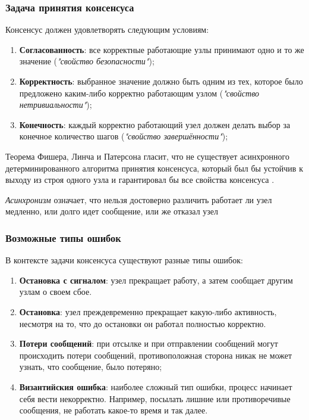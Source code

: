 \documentclass[pdf, 10pt, unicode,aspectratio=169]{beamer} %
\begin{document}
\begin{frame}
	\frametitle{Задача принятия консенсуса}

Консенсус должен удовлетворять следующим условиям:
\begin{enumerate}
\item \textbf{Согласованность}: все корректные работающие узлы принимают одно и то же значение (\textit{"свойство безопасности"});
\item \textbf{Корректность}: выбранное значение должно быть одним из тех, которое было предложено каким-либо корректно работающим узлом (\textit{"свойство нетривиальности"});
\item \textbf{Конечность}: каждый корректно работающий узел должен делать выбор за конечное количество шагов (\textit{"свойство завершённости"});
\end{enumerate}


Теорема Фишера, Линча и Патерсона гласит, что не существует асинхронного детерминированного алгоритма принятия консенсуса, который был бы устойчив к выходу из строя одного узла и гарантировал бы все свойства консенсуса \cite{Theorem_FLP}.

\emph{Асинхронизм} означает, что нельзя достоверно различить работает ли узел медленно, или долго идет сообщение, или же отказал узел

\end{frame}


\begin{frame}
	\frametitle{Возможные типы ошибок}

В контексте задачи консенсуса существуют разные типы ошибок:
\begin{enumerate}
\item \textbf{Остановка с сигналом}: узел прекращает работу, а затем сообщает другим узлам о своем сбое. 

\item \textbf{Остановка}: узел преждевременно прекращает какую-либо активность, несмотря на то, что до остановки он работал полностью корректно.

\item \textbf{Потери сообщений}: при отсылке и при отправлении сообщений могут происходить потери сообщений, противоположная сторона никак не может узнать, что сообщение, было потеряно;

\item \textbf{Византийския ошибка}: наиболее сложный тип ошибки, процесс начинает себя вести некорректно. Например, посылать лишние или противоречивые сообщения, не работать какое-то время и так далее.
\end{enumerate}

\end{frame}
\end{document}
